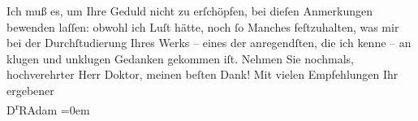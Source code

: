 \begin{ledgroupsized}[t]{13cm}
           \pstart
           Ich muß es, um Ihre Geduld nicht zu erſchöpfen, \strikeout{\textcolor{gray}{an}} bei dieſen Anmerkungen bewenden laſſen: obwohl ich Luſt hätte, noch ſo Manches
               feſtzuhalten, was mir bei der Durchſtudierung Ihres Werks – eines der anregendſten,
               die ich kenne – an klugen und unklugen Gedanken gekommen iſt.\pend
           \pstart
           Nehmen Sie nochmals, hochverehrter Herr Doktor, meinen beſten {\pb}Dank!\pend
           \pstart
           Mit vielen Empfehlungen Ihr{\\[\baselineskip]}ergebener{\\[\baselineskip]}\spacefill\mbox{D\textsuperscript{r}RAdam}\pend
           \leftskip=0em{}\endnumbering{}\end{ledgroupsized}  \newcommand{\dateiname}{L02483}\newcommand{\titel}{Robert Adam an Arthur Schnitzler, 21. 3. 1927}\newcommand{\editorInnen}{Martin Anton Müller und Gerd-Hermann Susen}
            \footnotesize
\begin{ledgroupsized}[t]{11.5cm}
\end{ledgroupsized}
         
      